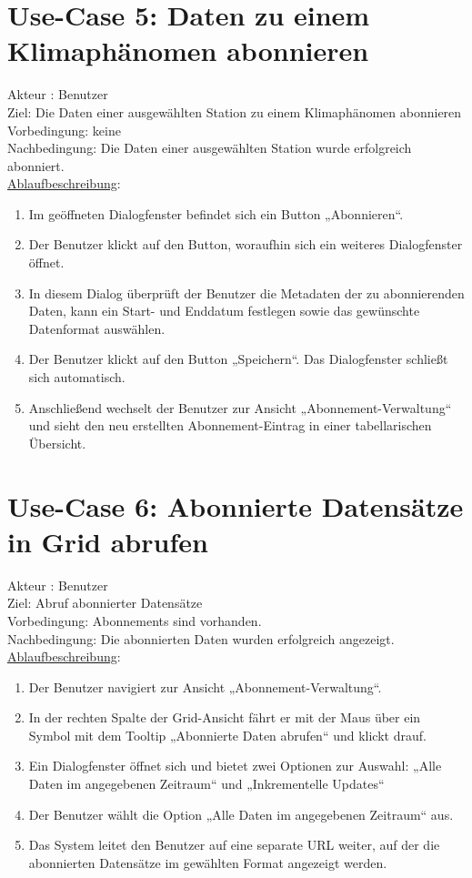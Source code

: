 \documentclass[a4paper,12pt]{scrreprt}
\begin{document}
	\section*{\small \textbf{Use-Case 5: Daten zu einem Klimaphänomen abonnieren}}
	Akteur : Benutzer\\
	Ziel: Die Daten einer ausgewählten Station zu einem Klimaphänomen abonnieren\\
	Vorbedingung: keine\\
	Nachbedingung: Die Daten einer ausgewählten Station wurde erfolgreich abonniert.\\
	\underline{Ablaufbeschreibung}:
	\begin{enumerate}
		\item Im geöffneten Dialogfenster befindet sich ein Button „Abonnieren“.
		\item Der Benutzer klickt auf den Button, woraufhin sich ein weiteres Dialogfenster öffnet.
		\item In diesem Dialog überprüft der Benutzer die Metadaten der zu abonnierenden Daten, kann ein Start- und Enddatum festlegen sowie das gewünschte Datenformat auswählen.
		\item Der Benutzer klickt auf den Button „Speichern“. Das Dialogfenster schließt sich automatisch.
		\item Anschließend wechselt der Benutzer zur Ansicht „Abonnement-Verwaltung“ und sieht den neu erstellten Abonnement-Eintrag in einer tabellarischen Übersicht.
	\end{enumerate}
	
\section*{\small \textbf{Use-Case 6: Abonnierte Datensätze in Grid abrufen}}
Akteur : Benutzer\\
Ziel: Abruf abonnierter Datensätze\\
Vorbedingung: Abonnements sind vorhanden.\\
Nachbedingung: Die abonnierten Daten wurden erfolgreich angezeigt.\\
\underline{Ablaufbeschreibung}:
\begin{enumerate}
	\item Der Benutzer navigiert zur Ansicht „Abonnement-Verwaltung“.
	\item In der rechten Spalte der Grid-Ansicht fährt er mit der Maus über ein Symbol mit dem Tooltip „Abonnierte Daten abrufen“ und klickt drauf.
	\item Ein Dialogfenster öffnet sich und bietet zwei Optionen zur Auswahl: „Alle Daten im angegebenen Zeitraum“ und „Inkrementelle Updates“
	\item Der Benutzer wählt die Option „Alle Daten im angegebenen Zeitraum“ aus.
	\item Das System leitet den Benutzer auf eine separate URL weiter, auf der die abonnierten Datensätze im gewählten Format angezeigt werden.
\end{enumerate}
\end{document}
